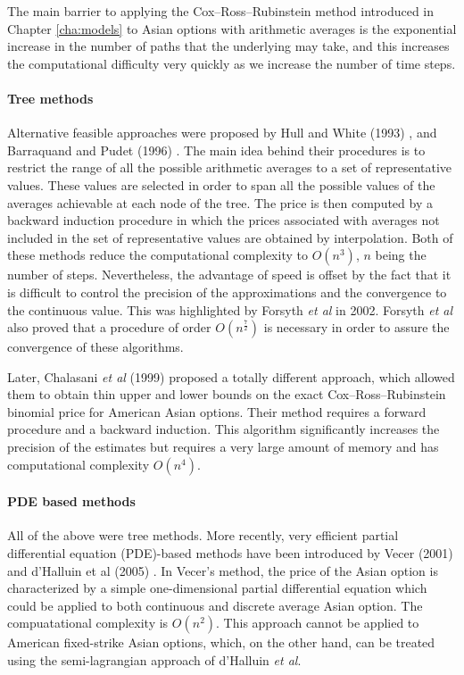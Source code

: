 The main barrier to applying the Cox–Ross–Rubinstein method \cite{Cox1979} introduced in Chapter \ref{cha:models} to Asian options with arithmetic averages is the exponential increase in the number of paths that the underlying may take, and this increases the computational difficulty very quickly as we increase the number of time steps.

\paragraph{Tree methods}
Alternative feasible approaches were proposed by Hull and White (1993) \cite{Hull1993}, and Barraquand and Pudet (1996) \cite{Barraquand1996}. The main idea behind their procedures is to restrict the range of all the possible arithmetic averages to a set of representative values. These values are selected in order to span all the possible values of the averages achievable at each node of the tree. The price is then computed by a backward induction procedure in which the prices associated with averages not included in the set of representative values are obtained by interpolation. Both of these methods reduce the computational complexity to $ O(n^3) $, $ n $ being the number of steps. Nevertheless, the advantage of speed is offset by the fact that it is difficult to control the precision of the approximations and the convergence to the continuous value. This was highlighted by Forsyth \emph{et al} \cite{Forsyth2002} in 2002. Forsyth \emph{et al} also proved that a procedure of order $ O(n^{\frac{7}{2}}) $ is necessary in order to assure the convergence of these algorithms.

Later, Chalasani \emph{et al} (1999) \cite{Chalasani1999} proposed a totally different approach, which allowed them to obtain thin upper and lower bounds on the exact Cox–Ross–Rubinstein binomial price for American Asian options. Their method requires a forward procedure and a backward induction. This algorithm significantly increases the precision of the estimates but requires a very large amount of memory and has computational complexity $ O(n^4) $.

\paragraph{PDE based methods}
All of the above were tree methods. More recently, very efficient partial differential equation (PDE)-based methods have been introduced by Vecer (2001) \cite{Vecer2001} and d'Halluin et al (2005) \cite{dHalluin2005}. In Vecer's method, the price of the Asian option is characterized by a simple one-dimensional partial differential equation which could be applied to both continuous and discrete average Asian option. The compuatational complexity is $ O(n^2) $. This approach cannot be applied to American fixed-strike Asian options, which, on the other hand, can be treated using the semi-lagrangian approach of d'Halluin \emph{et al}.

